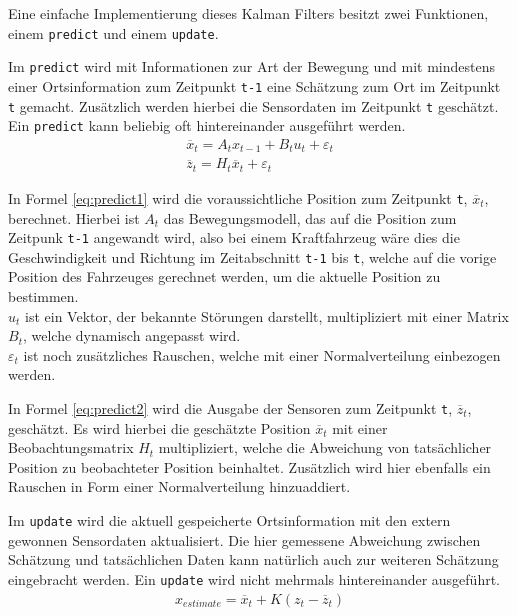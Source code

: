 \documentclass[12pt,a4paper,ngerman]{scrartcl}
\begin{document}
Eine einfache Implementierung dieses Kalman Filters besitzt zwei Funktionen, einem {\tt predict} und einem {\tt update}.

Im {\tt predict} wird mit Informationen zur Art der Bewegung und mit mindestens einer Ortsinformation zum Zeitpunkt {\tt t-1} eine Schätzung zum Ort im Zeitpunkt {\tt t} gemacht. Zusätzlich werden hierbei die Sensordaten im Zeitpunkt {\tt t} geschätzt. Ein {\tt predict} kann beliebig oft hintereinander ausgeführt werden.
\begin{align}
\overline{x}_{t} = A_{t}x_{t-1} + B_{t}u_{t} + \varepsilon_{t} \label{eq:predict1}\\
\overline{z}_{t} = H_{t}\overline{x}_{t} + \varepsilon_{t} \label{eq:predict2}
\end{align}

In Formel \eqref{eq:predict1} wird die voraussichtliche Position zum Zeitpunkt {\tt t}, $\overline{x}_{t}$, berechnet. Hierbei ist $A_{t}$ das Bewegungsmodell, das auf die Position zum Zeitpunk {\tt t-1} angewandt wird, also bei einem Kraftfahrzeug wäre dies die Geschwindigkeit und Richtung im Zeitabschnitt {\tt t-1} bis {\tt t}, welche auf die vorige Position des Fahrzeuges gerechnet werden, um die aktuelle Position zu bestimmen.\\
$u_{t}$ ist ein Vektor, der bekannte Störungen darstellt, multipliziert mit einer Matrix $B_{t}$, welche dynamisch angepasst wird.\\
$\varepsilon_{t}$ ist noch zusätzliches Rauschen, welche mit einer Normalverteilung einbezogen werden.

In Formel \eqref{eq:predict2} wird die Ausgabe der Sensoren zum Zeitpunkt {\tt t}, $\overline{z}_{t}$, geschätzt. Es wird hierbei die geschätzte Position $\overline{x}_{t}$ mit einer Beobachtungsmatrix $H_{t}$ multipliziert, welche die Abweichung von tatsächlicher Position zu beobachteter Position beinhaltet. Zusätzlich wird hier ebenfalls ein Rauschen in Form einer Normalverteilung hinzuaddiert.

Im {\tt update} wird die aktuell gespeicherte Ortsinformation mit den extern gewonnen Sensordaten aktualisiert. Die hier gemessene Abweichung zwischen Schätzung und tatsächlichen Daten kann natürlich auch zur weiteren Schätzung eingebracht werden. Ein {\tt update} wird nicht mehrmals hintereinander ausgeführt.
\begin{align}
x_{estimate} = \overline{x}_{t} + K(z_{t} - \overline{z}_{t}) \label{eq:update}
\end{align}
\end{document}
